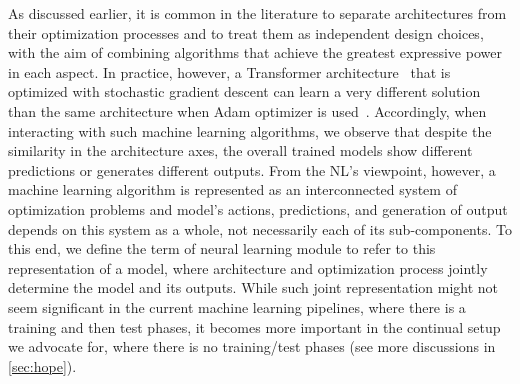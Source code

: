 As discussed earlier, it is common in the literature to separate architectures from their optimization processes and to treat them as independent design choices, with the aim of combining algorithms that achieve the greatest expressive power in each aspect. In practice, however, a Transformer architecture~\citep{transformers} that is optimized with stochastic gradient descent can learn  a very different solution than the same architecture when  Adam optimizer is used~\citep{kingma2014adam}. Accordingly, when interacting with such machine learning algorithms, we observe that despite the similarity in the architecture axes, the overall trained models show different predictions or generates different outputs. From the NL's viewpoint, however, a machine learning algorithm is represented as an interconnected system of optimization problems and model's actions, predictions, and generation of output depends on this system as a whole, not necessarily each of its sub-components. To this end, we define the term of neural learning module to refer to this representation of a model, where architecture and optimization process jointly determine the model and its outputs. While such joint representation might not seem significant in the current machine learning pipelines, where there is a training and then test phases, it becomes more important in the continual setup we advocate for, where there is no training/test phases (see more discussions in \autoref{sec:hope}).   



